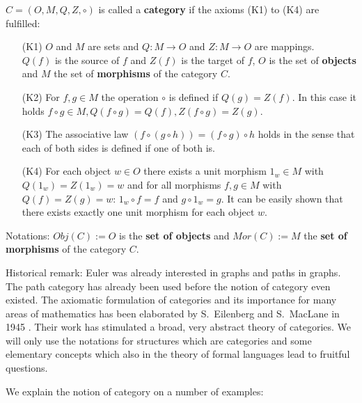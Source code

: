 \begin{definition}[category]
$C = (O, M, Q, Z, \circ)$ is called a {\bf category} if the axioms (K1) to
(K4) are fulfilled:
\begin{enumerate}
  \item[(K1)] $O$ and $M$ are sets and $Q: M \to O$ and $Z: M \to O$ are
  mappings.\\
  $Q(f)$ is the source of $f$ and $Z(f)$ is the target of $f$, $O$ is the set of
  {\bf objects} and $M$ the set of {\bf morphisms} of the category $C$.
  \item[(K2)] For $f, g \in M$ the operation $\circ$ is defined if $Q(g) =
  Z(f)$. In this case it holds $f \circ g \in M, Q(f \circ g) = Q(f), Z(f
  \circ g) = Z(g)$.
  \item[(K3)] The associative law $(f \circ (g \circ h)) = (f \circ g) \circ h$
  holds in the sense that each of both sides is defined if one of both is.
  \item[(K4)] For each object $w \in O$ there exists a unit morphism $1_w \in M$
  with $Q(1_w) = Z(1_w) = w$ and for all morphisms $f, g \in M$ with $Q(f) =
  Z(g) = w$: $1_w \circ f = f$ and $g \circ 1_w = g$. It can be easily shown
  that there exists exactly one unit morphism for each object $w$.
\end{enumerate}
\end{definition}


Notations: $Obj(C) := O$ is the {\bf set of objects} and $Mor(C) := M$ the
{\bf set of morphisms} of the category $C$.

Historical remark: Euler was already interested in graphs and paths in graphs.
The path category has already been used before the notion of category even
existed. The axiomatic formulation of categories and its importance for many
areas of mathematics has been elaborated by S.\ Eilenberg and S.\ MacLane in
1945 \cite{Ei.Ma}. Their work has stimulated a broad, very abstract theory of
categories. We will only use the notations for structures which are categories
and some elementary concepts which also in the theory of formal languages lead
to fruitful questions.

We explain the notion of category on a number of examples:

